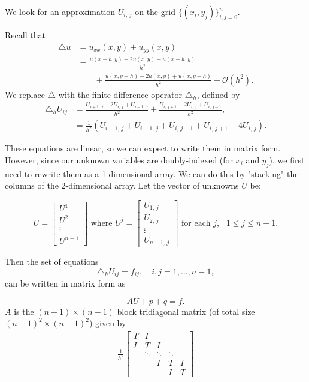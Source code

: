We look for an approximation $U_{i,\,j}$ on the grid $\{(x_i,y_j)\}_{i,j=0}^{n}$.

Recall that
 \begin{align*}
 \triangle u &= u_{xx}(x,y) + u_{yy}(x,y) \\
&= \frac{u(x+h,y) - 2u(x,y)+ u(x-h,y)}{h^2} \\
 & \qquad{}+ 
 \frac{u(x,y+h) - 2u(x,y)+ u(x,y-h)}{h^2} + \mathcal{O}(h^2).
 \end{align*}
 We replace $\triangle $ with the finite difference operator $\triangle_h$, defined by
 \begin{align}
 \triangle_h U_{ij} &= \frac{U_{i+1,\,j} - 2U_{i,\,j} + U_{i-1,\,j}}{h^2} + \frac{U_{i,\,j+1} - 2U_{i,\,j}+ U_{i,\,j-1}}{h^2},\\
&= \frac{1}{h^2}(U_{i-1,\,j} + U_{i+1,\,j} + U_{i,\,j-1} + U_{i,\,j+1}-4U_{i,\,j}).
\label{eqn:finite_diff_op}
 \end{align}

These equations are linear, so we can expect to write them in matrix form.
However, since our unknown variables are doubly-indexed (for $x_i$ and $y_j$), we first need to rewrite them as a 1-dimensional array.
We can do this by "stacking" the columns of the 2-dimensional array.
Let the vector of unknowns $U$ be:

\[U = \begin{bmatrix} U^1 \\ U^2 \\ \vdots \\ U^{n-1} \end{bmatrix} \text{ where } U^j = 
\begin{bmatrix} U_{1,\,j} \\ U_{2,\,j} \\ \vdots \\ U_{n-1,\,j} \end{bmatrix} \text{ for each } j, \text{ }1\leq j \leq n-1.\]

Then the set of equations  
\[
\triangle_h U_{ij} = f_{ij}, \quad i,j = 1,\ldots,n-1,
\]%
can be written in matrix form as

\begin{equation} \label{eqn:matrix_form}
AU + p +  q  = f.
\end{equation}
$A$ is the $(n-1) \times (n-1)$ block tridiagonal matrix (of total size $(n-1)^2 \times (n-1)^2$) given by 
\begin{align}
	\frac{1}{h^2}
\begin{bmatrix}
T & I & &  &\\
I &T & I & &\\
&\ddots  & \ddots & \ddots & \\
&  & I & T & I \\
&  &  & I & T\end{bmatrix}\label{poisson2d:matrixA}
\end{align}

